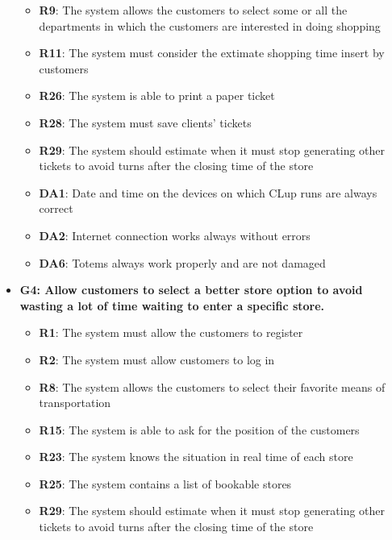 \documentclass{article}
\begin{document}
\begin{itemize}
\begin{itemize}
						\item {\bfseries R9}: The system allows the customers to select some or all the departments in which the customers are interested in doing shopping
						\item {\bfseries R11}: The system must consider the extimate shopping time insert by customers
						\item {\bfseries R26}: The system is able to print a paper ticket
						\item {\bfseries R28}: The system must save clients’ tickets
						\item {\bfseries R29}: The system should estimate when it must stop generating other tickets to	avoid turns after the closing time of the store \\
		
						\item {\bfseries DA1}: Date and time on the devices on which CLup runs are always correct
						\item {\bfseries DA2}: Internet connection works always without errors
						\item {\bfseries DA6}: Totems always work properly and are not damaged
						
					\end{itemize}

				\item {\bfseries G4: Allow customers to select a better store option to avoid wasting a lot of time waiting to enter a specific store.}	

					\begin{itemize}
						
						\item {\bfseries R1}: The system must allow the customers to register
						\item {\bfseries R2}: The system must allow customers to log in
						\item {\bfseries R8}: The system allows the customers to select their favorite means of transportation
						\item {\bfseries R15}: The system is able to ask for the position of the customers
						\item {\bfseries R23}: The system knows the situation in real time of each store
						\item {\bfseries R25}: The system contains a list of bookable stores
						\item {\bfseries R29}: The system should estimate when it must stop generating other tickets to	avoid turns after the closing time of the store \\
		

\end{itemize}
\end{itemize}
\end{document}
